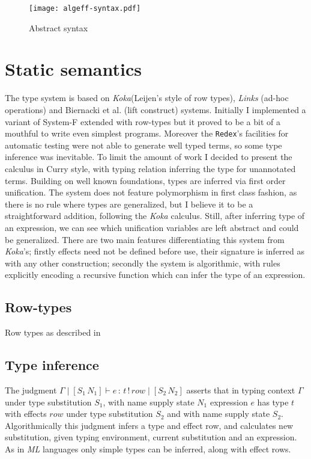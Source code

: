 \documentclass[inz, english, shortabstract]{iithesis}
\begin{document}
\begin{figure}
  \centering
  \texttt{[image: algeff-syntax.pdf]}
  \caption{Abstract syntax}
  \label{fig:algeff-syntax}
\end{figure}

\section{Static semantics}
The type system is based on \emph{Koka}(Leijen's style of row types\cite{Leijen2005}), \emph{Links}\cite{Hillerstrom2016} (ad-hoc operations) and Biernacki et al. \cite{Biernacki2017} (lift construct) systems.
Initially I implemented a variant of System-F extended with row-types but it proved to be a bit of a mouthful to write even simplest programs.
Moreover the \texttt{Redex}'s facilities for automatic testing were not able to generate well typed terms, so some type inference was inevitable.
To limit the amount of work I decided to present the calculus in Curry style, with typing relation inferring the type for unannotated terms.
Building on well known foundations, types are inferred via first order unification.
The system does not feature polymorphism in first class fashion, as there is no rule where types are generalized, but I believe it to be a straightforward addition, following the \emph{Koka}\cite{Leijen2014} calculus.
Still, after inferring type of an expression, we can see which unification variables are left abstract and could be generalized.
There are two main features differentiating this system from \emph{Koka}'s; firstly effects need not be defined before use, their signature is inferred as with any other construction; secondly the system is algorithmic, with rules explicitly encoding a recursive function which can infer the type of an expression.

\subsection{Row-types}
Row types as described in \cite{Leijen2005}

\subsection{Type inference}
The judgment $ \Gamma \mid [S_1 \, N_1] \vdash e \, : \, t \, ! \, row \mid [S_2 \, N_2] $ asserts that in typing context $ \Gamma $ under type substitution $ S_1 $, with name supply state $ N_1 $ expression $ e $ has type $ t $ with effects $ row $ under type substitution $ S_2 $ and with name supply state $ S_2 $.
Algorithmically this judgment infers a type and effect row, and calculates new substitution, given typing environment, current substitution and an expression.
As in \emph{ML} languages only simple types can be inferred, along with effect rows.
\end{document}
